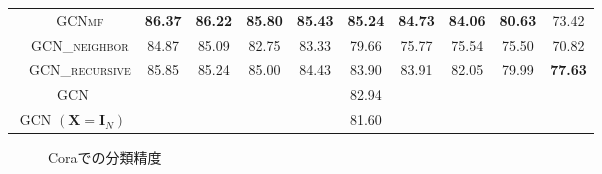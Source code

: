 \begin{table}[!pt]
{\begin{tabular}{c|c|ccccccccc}
& \textsc{GCNmf} & \textbf{86.37} & \textbf{86.22} & \textbf{85.80} & \textbf{85.43} & \textbf{85.24} & \textbf{84.73} & \textbf{84.06} & \textbf{80.63} & 73.42\\ 
& \textsc{GCN\_neighbor} & 84.87 & 85.09 & 82.75 & 83.33 & 79.66 & 75.77 & 75.54 & 75.50 & 70.82 \\ 
& \textsc{GCN\_recursive} & 85.85 & 85.24 & 85.00 & 84.43 & 83.90 & 83.91 & 82.05 & 79.99 & \bf{77.63} \\
\midrule
\multicolumn{2}{c|}{GCN}& \multicolumn{9}{c}{82.94}\\
\multicolumn{2}{c|}{GCN $(\mathbf{X} = \mathbf{I}_N)$}& \multicolumn{9}{c}{81.60}\\
\bottomrule
    \end{tabular}
    }
\end{table}






\begin{figure}
	\caption{Coraでの分類精度}
	\label{fig:rec_cora}
\end{figure}

